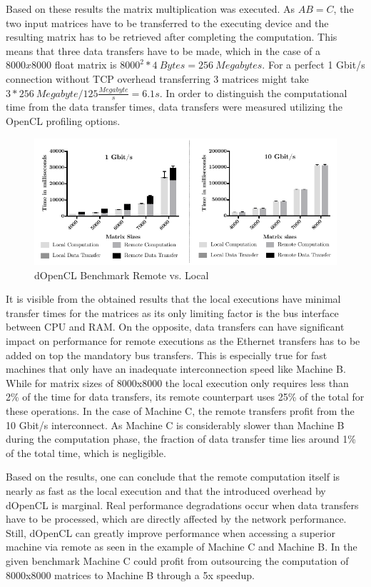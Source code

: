 Based on these results the matrix multiplication was executed. As $AB = C$, the two input matrices have to be transferred to the executing device and the resulting matrix has to be retrieved after completing the computation. This means that three data transfers have to be made, which in the case of a $8000x8000$ float matrix is $8000^2 * 4\ Bytes = 256\ Megabytes$. For a perfect 1 Gbit/s connection without TCP overhead transferring 3 matrices might take $3*256\ Megabyte / 125\frac{Megabyte}{s} = 6.1s$. In order to distinguish the computational time from the data transfer times, data transfers were measured utilizing the OpenCL profiling options.

\begin{figure}[H]

\includegraphics[width=1.0\textwidth]{images/data_transfer.pdf}
\centering
\caption{dOpenCL Benchmark Remote vs. Local}
\label{img:data_transfer}
\end{figure}

It is visible from the obtained results that the local executions have minimal transfer times for the matrices as its only limiting factor is the bus interface between CPU and RAM. On the opposite, data transfers can have significant impact on performance for remote executions as the Ethernet transfers has to be added on top the mandatory bus transfers. This is especially true for fast machines that only have an inadequate interconnection speed like Machine B. While for matrix sizes of 8000x8000 the local execution only requires less than 2\% of the time for data transfers, its remote counterpart uses 25\% of the total for these operations. In the case of Machine C, the remote transfers profit from the 10 Gbit/s interconnect. As Machine C is considerably slower than Machine B during the computation phase, the fraction of data transfer time lies around 1\% of the total time, which is negligible.

Based on the results, one can conclude that the remote computation itself is nearly as fast as the local execution and that the introduced overhead by dOpenCL is marginal. Real performance degradations occur when data transfers have to be processed, which are directly affected by the network performance. Still, dOpenCL can greatly improve performance when accessing a superior machine via remote as seen in the example of Machine C and Machine B. In the given benchmark Machine C could profit from outsourcing the computation of 8000x8000 matrices to Machine B through a 5x speedup.

